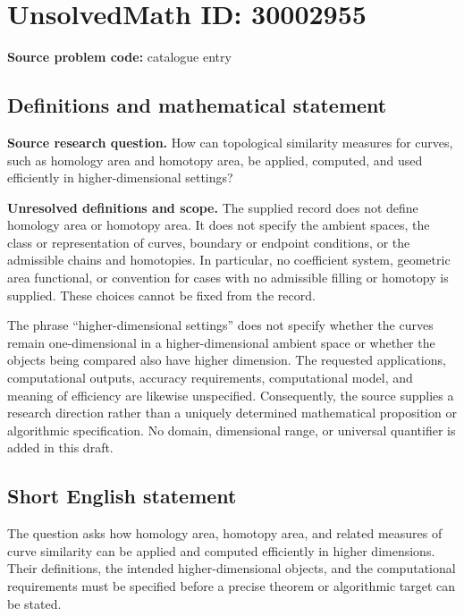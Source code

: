 \documentclass[11pt]{article}
\begin{document}
\section*{UnsolvedMath ID: 30002955}
\textbf{Source problem code:} catalogue entry
\subsection{Definitions and mathematical statement}
\textbf{Source research question.} How can topological similarity measures for curves, such as homology area and homotopy area, be applied, computed, and used efficiently in higher-dimensional settings?

\textbf{Unresolved definitions and scope.} The supplied record does not define homology area or homotopy area. It does not specify the ambient spaces, the class or representation of curves, boundary or endpoint conditions, or the admissible chains and homotopies. In particular, no coefficient system, geometric area functional, or convention for cases with no admissible filling or homotopy is supplied. These choices cannot be fixed from the record.

The phrase ``higher-dimensional settings'' does not specify whether the curves remain one-dimensional in a higher-dimensional ambient space or whether the objects being compared also have higher dimension. The requested applications, computational outputs, accuracy requirements, computational model, and meaning of efficiency are likewise unspecified. Consequently, the source supplies a research direction rather than a uniquely determined mathematical proposition or algorithmic specification. No domain, dimensional range, or universal quantifier is added in this draft.
\subsection{Short English statement}
The question asks how homology area, homotopy area, and related measures of curve similarity can be applied and computed efficiently in higher dimensions. Their definitions, the intended higher-dimensional objects, and the computational requirements must be specified before a precise theorem or algorithmic target can be stated.
\end{document}

